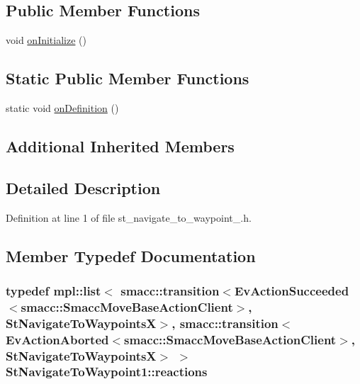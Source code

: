 \subsection*{Public Member Functions}
\begin{DoxyCompactItemize}
\item 
void \hyperlink{structStNavigateToWaypoint1_abf862e4062f5c46d80c0779db4485387}{on\+Initialize} ()
\end{DoxyCompactItemize}
\subsection*{Static Public Member Functions}
\begin{DoxyCompactItemize}
\item 
static void \hyperlink{structStNavigateToWaypoint1_a03056daef3018d51d81cee694ec305ce}{on\+Definition} ()
\end{DoxyCompactItemize}
\subsection*{Additional Inherited Members}


\subsection{Detailed Description}


Definition at line 1 of file st\+\_\+navigate\+\_\+to\+\_\+waypoint\+\_.\+h.



\subsection{Member Typedef Documentation}
\subsubsection[{\texorpdfstring{reactions}{reactions}}]{\setlength{\rightskip}{0pt plus 5cm}typedef mpl\+::list$<$ {\bf smacc\+::transition}$<$Ev\+Action\+Succeeded$<${\bf smacc\+::\+Smacc\+Move\+Base\+Action\+Client}$>$, {\bf St\+Navigate\+To\+WaypointsX}$>$, {\bf smacc\+::transition}$<$Ev\+Action\+Aborted$<${\bf smacc\+::\+Smacc\+Move\+Base\+Action\+Client}$>$, {\bf St\+Navigate\+To\+WaypointsX}$>$ $>$ {\bf St\+Navigate\+To\+Waypoint1\+::reactions}}\hypertarget{structStNavigateToWaypoint1_a2ac6680a4d661d6e2998f68c69ab8efd}{}\label{structStNavigateToWaypoint1_a2ac6680a4d661d6e2998f68c69ab8efd}


